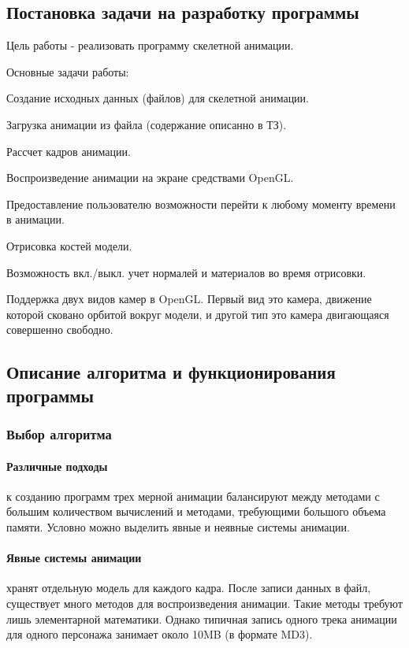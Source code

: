 \subsection{Постановка задачи на разработку программы}
    Цель работы - реализовать программу скелетной анимации.

\bigskip
Основные задачи работы:

\smallskip
\begin{my_enumerate}
\item Создание исходных данных (файлов) для скелетной анимации.
\item Загрузка анимации из файла (содержание описанно в ТЗ).
\item Рассчет кадров анимации.
\item Воспроизведение анимации на экране средствами OpenGL.
\item Предоставление пользователю возможности перейти к любому моменту времени в анимации.
\item Отрисовка костей модели.
\item Возможность вкл./выкл. учет нормалей и материалов во время отрисовки.
\item Поддержка двух видов камер в OpenGL. Первый вид это камера, движение которой сковано орбитой вокруг модели, и другой тип это камера двигающаяся совершенно свободно.
\end{my_enumerate}


\subsection{Описание алгоритма и функционирования программы}


\subsubsection{Выбор алгоритма}

\paragraph{Различные подходы}
к созданию программ трех мерной анимации балансируют между методами с большим количеством вычислений и методами, требующими большого объема памяти. Условно можно выделить явные и неявные системы анимации.

\paragraph{Явные системы анимации} хранят отдельную модель для каждого кадра.
После записи данных в файл, существует много методов для воспроизведения анимации.
Такие методы требуют лишь элементарной математики.
Однако типичная запись одного трека анимации для одного персонажа занимает около 10MB (в формате MD3).

